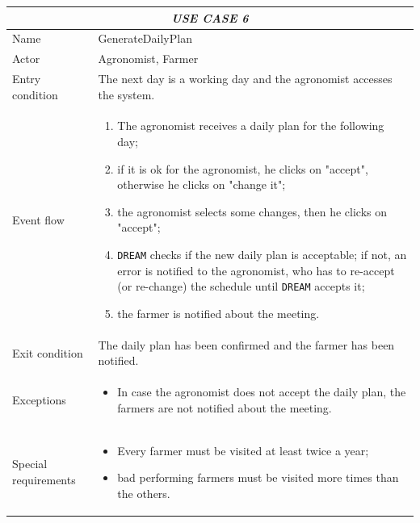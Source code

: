 \documentclass{article}
\begin{document}
\centering
\begin{tabular}{|p{3.5cm}|m{8cm}|}
 \hline
 \multicolumn{2}{|c|}{\emph{USE CASE 6}} \\
 \hline
 Name & GenerateDailyPlan\\
 \hline
 Actor & Agronomist, Farmer\\
 \hline
 Entry condition & The next day is a working day and the agronomist accesses the system.\\
 \hline
 Event flow & \begin{enumerate}
    \item The agronomist receives a daily plan for the following day;
    \item if it is ok for the agronomist, he clicks on  "accept", otherwise he clicks on "change it";
    \item the agronomist selects some changes, then he clicks on "accept";
    \item \verb|DREAM| checks if the new daily plan is acceptable; if not, an error is notified to the agronomist, who has to re-accept (or re-change) the schedule until \verb|DREAM| accepts it;
    \item the farmer is notified about the meeting.
 \end{enumerate}\\
 \hline
 Exit condition & The daily plan has been confirmed and the farmer has been notified.\\
 \hline
 Exceptions & \begin{itemize}
     \item In case the agronomist does not accept the daily plan, the farmers are not notified about the meeting.
 \end{itemize}\\
 \hline
 Special requirements &\begin{itemize}
     \item Every farmer must be visited at least twice a year;
     \item bad performing farmers must be visited more times than the others.
 \end{itemize}\\
 \hline
\end{tabular}
\end{document}
